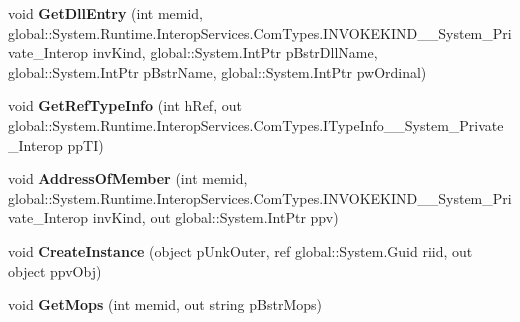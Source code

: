 \begin{DoxyCompactItemize}
void {\bfseries Get\+Dll\+Entry} (int memid, global\+::\+System.\+Runtime.\+Interop\+Services.\+Com\+Types.\+I\+N\+V\+O\+K\+E\+K\+I\+N\+D\+\_\+\+\_\+\+System\+\_\+\+Private\+\_\+\+Interop inv\+Kind, global\+::\+System.\+Int\+Ptr p\+Bstr\+Dll\+Name, global\+::\+System.\+Int\+Ptr p\+Bstr\+Name, global\+::\+System.\+Int\+Ptr pw\+Ordinal)
\item 
\mbox{\label{interface_system_1_1_runtime_1_1_interop_services_1_1_com_types_1_1_i_type_info_____system___private___interop_af4dec31689d92f94d3290424d918deaf}} 
void {\bfseries Get\+Ref\+Type\+Info} (int h\+Ref, out global\+::\+System.\+Runtime.\+Interop\+Services.\+Com\+Types.\+I\+Type\+Info\+\_\+\+\_\+\+System\+\_\+\+Private\+\_\+\+Interop pp\+TI)
\item 
\mbox{\label{interface_system_1_1_runtime_1_1_interop_services_1_1_com_types_1_1_i_type_info_____system___private___interop_ac1887de5b20a5e26671bbe3eea33a1e0}} 
void {\bfseries Address\+Of\+Member} (int memid, global\+::\+System.\+Runtime.\+Interop\+Services.\+Com\+Types.\+I\+N\+V\+O\+K\+E\+K\+I\+N\+D\+\_\+\+\_\+\+System\+\_\+\+Private\+\_\+\+Interop inv\+Kind, out global\+::\+System.\+Int\+Ptr ppv)
\item 
\mbox{\label{interface_system_1_1_runtime_1_1_interop_services_1_1_com_types_1_1_i_type_info_____system___private___interop_a3761e8c27250fe83496741af259e32b2}} 
void {\bfseries Create\+Instance} (object p\+Unk\+Outer, ref global\+::\+System.\+Guid riid, out object ppv\+Obj)
\item 
\mbox{\label{interface_system_1_1_runtime_1_1_interop_services_1_1_com_types_1_1_i_type_info_____system___private___interop_ad7930f0f8850b675844658850a360028}} 
void {\bfseries Get\+Mops} (int memid, out string p\+Bstr\+Mops)
\item 
\mbox{\label{interface_system_1_1_runtime_1_1_interop_services_1_1_com_types_1_1_i_type_info_____system___private___interop_acc525f75f6bdf2ae3ff9bd1d132e010e}} 

\end{DoxyCompactItemize}
